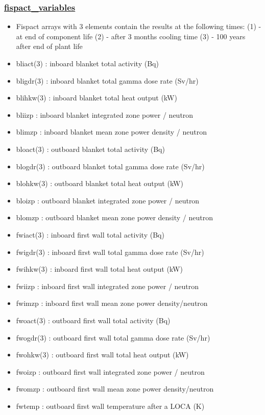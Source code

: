 \documentclass[]{article}
\providecommand{\tightlist}{%
  \setlength{\itemsep}{0pt}\setlength{\parskip}{0pt}}
\begin{document}
\subsubsection{\texorpdfstring{\href{fispact_variables.html}{fispact\_variables}}{fispact\_variables}}\label{fispact_variables}

\begin{itemize}
\tightlist
\item
  Fispact arrays with 3 elements contain the results at the following
  times: (1) - at end of component life (2) - after 3 months cooling
  time (3) - 100 years after end of plant life
\item
  bliact(3) : inboard blanket total activity (Bq)
\item
  bligdr(3) : inboard blanket total gamma dose rate (Sv/hr)
\item
  blihkw(3) : inboard blanket total heat output (kW)
\item
  bliizp : inboard blanket integrated zone power / neutron
\item
  blimzp : inboard blanket mean zone power density / neutron
\item
  bloact(3) : outboard blanket total activity (Bq)
\item
  blogdr(3) : outboard blanket total gamma dose rate (Sv/hr)
\item
  blohkw(3) : outboard blanket total heat output (kW)
\item
  bloizp : outboard blanket integrated zone power / neutron
\item
  blomzp : outboard blanket mean zone power density / neutron
\item
  fwiact(3) : inboard first wall total activity (Bq)
\item
  fwigdr(3) : inboard first wall total gamma dose rate (Sv/hr)
\item
  fwihkw(3) : inboard first wall total heat output (kW)
\item
  fwiizp : inboard first wall integrated zone power / neutron
\item
  fwimzp : inboard first wall mean zone power density/neutron
\item
  fwoact(3) : outboard first wall total activity (Bq)
\item
  fwogdr(3) : outboard first wall total gamma dose rate (Sv/hr)
\item
  fwohkw(3) : outboard first wall total heat output (kW)
\item
  fwoizp : outboard first wall integrated zone power / neutron
\item
  fwomzp : outboard first wall mean zone power density/neutron
\item
  fwtemp : outboard first wall temperature after a LOCA (K)
\end{itemize}
\end{document}
